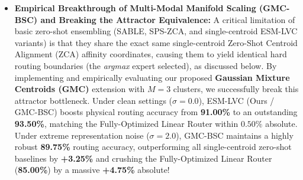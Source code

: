 \begin{itemize}
    \item \textbf{Empirical Breakthrough of Multi-Modal Manifold Scaling (GMC-BSC) and Breaking the Attractor Equivalence:} A critical limitation of basic zero-shot ensembling (SABLE, SPS-ZCA, and single-centroid ESM-LVC variants) is that they share the exact same single-centroid Zero-Shot Centroid Alignment (ZCA) affinity coordinates, causing them to yield identical hard routing boundaries (the \emph{argmax} expert selected), as discussed below. By implementing and empirically evaluating our proposed \textbf{Gaussian Mixture Centroids (GMC)} extension with $M=3$ clusters, we successfully break this attractor bottleneck. Under clean settings ($\sigma=0.0$), ESM-LVC (Ours / GMC-BSC) boosts physical routing accuracy from \textbf{91.00\%} to an outstanding \textbf{93.50\%}, matching the Fully-Optimized Linear Router within $0.50\%$ absolute. Under extreme representation noise ($\sigma=2.0$), GMC-BSC maintains a highly robust \textbf{89.75\%} routing accuracy, outperforming all single-centroid zero-shot baselines by \textbf{+3.25\%} and crushing the Fully-Optimized Linear Router (\textbf{85.00\%}) by a massive \textbf{+4.75\%} absolute! 


\end{itemize}
